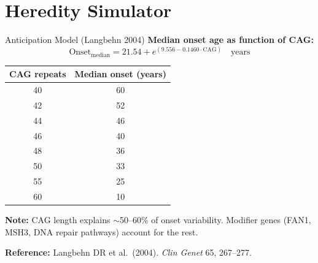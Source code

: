 \documentclass[aspectratio=169,11pt]{beamer}
\begin{document}
\section{Heredity Simulator}

\begin{frame}{Anticipation Model (Langbehn 2004)}
    \textbf{Median onset age as function of CAG:}
    \[
    \text{Onset}_{\text{median}} = 21.54 + e^{(9.556 - 0.1460 \cdot \text{CAG})} \quad \text{years}
    \]

    \begin{center}
        \begin{tabular}{c|c}
            \textbf{CAG repeats} & \textbf{Median onset (years)} \\ \hline
            40 & 60 \\
            42 & 52 \\
            44 & 46 \\
            46 & 40 \\
            48 & 36 \\
            50 & 33 \\
            55 & 25 \\
            60 & 10 \\
        \end{tabular}
    \end{center}

    \textbf{Note:} CAG length explains $\sim$50--60\% of onset variability. Modifier genes (FAN1, MSH3, DNA repair pathways) account for the rest.

    \textbf{Reference:} Langbehn DR et al.\ (2004). \textit{Clin Genet} 65, 267--277.
\end{frame}
\end{document}
